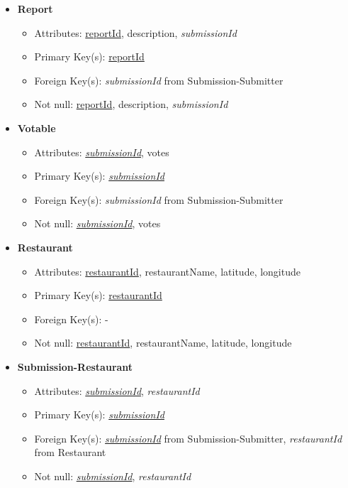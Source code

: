 \documentclass{article}
\begin{document}
\begin{itemize}
        \item \textbf{Report}
        \begin{itemize}
            \item Attributes: \underline{reportId}, description, \textit{submissionId}
            \item Primary Key(s): \underline{reportId}
            \item Foreign Key(s): \textit{submissionId} from Submission-Submitter
            \item Not null: \underline{reportId}, description, \textit{submissionId}
        \end{itemize}
            
        \item \textbf{Votable}
        \begin{itemize}
            \item Attributes: \underline{\textit{submissionId}}, votes
            \item Primary Key(s): \underline{\textit{submissionId}}
            \item Foreign Key(s): \textit{submissionId} from Submission-Submitter
            \item Not null: \underline{\textit{submissionId}}, votes
        \end{itemize}

        \item \textbf{Restaurant}
        \begin{itemize}
            \item Attributes: \underline{restaurantId}, restaurantName, latitude, longitude
            \item Primary Key(s): \underline{restaurantId}
            \item Foreign Key(s): -
            \item Not null: \underline{restaurantId}, restaurantName, latitude, longitude
        \end{itemize}

        \item \textbf{Submission-Restaurant}
        \begin{itemize}
            \item Attributes: \underline{\textit{submissionId}}, \textit{restaurantId}
            \item Primary Key(s): \underline{\textit{submissionId}}
            \item Foreign Key(s): \underline{\textit{submissionId}} from Submission-Submitter, \textit{restaurantId} from Restaurant
            \item Not null: \underline{\textit{submissionId}}, \textit{restaurantId}
        \end{itemize}


\end{itemize}
\end{document}
